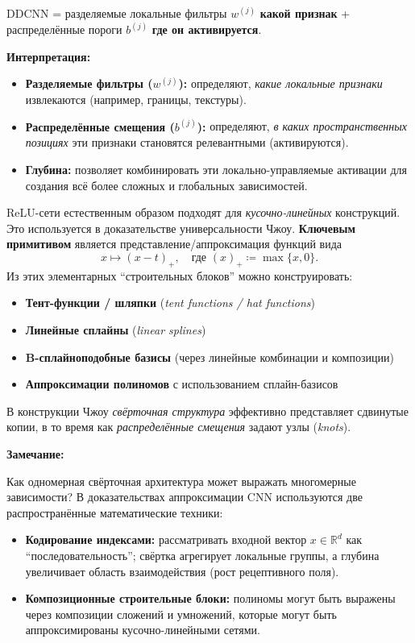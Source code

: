 \documentclass[../NDCNNAI_main.tex]{subfiles}
\begin{document}
\begin{remark}
    DDCNN = разделяемые локальные фильтры $w^{(j)}$ \textbf{какой признак} + распределённые пороги $b^{(j)}$ \textbf{где он активируется}.
\end{remark}

\textbf{Интерпретация:}
\begin{itemize}
    \item \textbf{Разделяемые фильтры ($w^{(j)}$):} определяют, \emph{какие локальные признаки} извлекаются (например, границы, текстуры).
    \item \textbf{Распределённые смещения ($b^{(j)}$):} определяют, \emph{в каких пространственных позициях} эти признаки становятся релевантными (активируются).
    \item \textbf{Глубина:} позволяет комбинировать эти локально-управляемые активации для создания всё более сложных и глобальных зависимостей.
\end{itemize}

ReLU-сети естественным образом подходят для \emph{кусочно-линейных} конструкций. Это используется в доказательстве универсальности Чжоу.
\textbf{Ключевым примитивом} является представление/аппроксимация функций вида
\[
x \mapsto (x - t)_+, \quad \text{где } (x)_+ \coloneq \max\{x, 0\}.
\]
Из этих элементарных ``строительных блоков'' можно конструировать:
\begin{itemize}
    \item \textbf{Тент-функции / шляпки} (\emph{tent functions / hat functions})
    \item \textbf{Линейные сплайны} (\emph{linear splines})
    \item \textbf{B-сплайноподобные базисы} (через линейные комбинации и композиции)
    \item \textbf{Аппроксимации полиномов} с использованием сплайн-базисов
\end{itemize}

\begin{remark}
    В конструкции Чжоу \emph{свёрточная структура} эффективно представляет сдвинутые копии, в то время как \emph{распределённые смещения} задают узлы (\emph{knots}).
\end{remark}
\textbf{Замечание:} 

Как одномерная свёрточная архитектура может выражать многомерные зависимости?
В доказательствах аппроксимации CNN используются две распространённые математические техники:

\begin{itemize}
    \item \textbf{Кодирование индексами:} рассматривать входной вектор $x \in \mathbb{R}^d$ как ``последовательность''; свёртка агрегирует локальные группы, а глубина увеличивает область взаимодействия (рост рецептивного поля).
    
    \item \textbf{Композиционные строительные блоки:} полиномы могут быть выражены через композиции сложений и умножений, которые могут быть аппроксимированы кусочно-линейными сетями.
\end{itemize}
\end{document}
